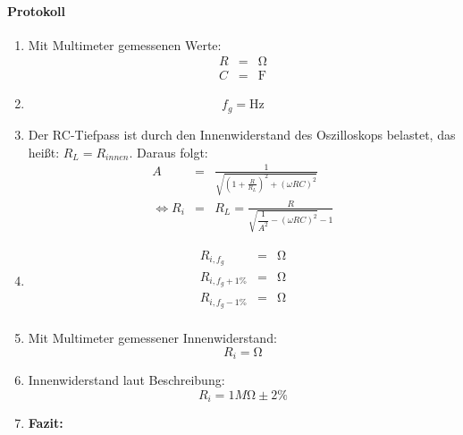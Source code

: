 \documentclass[10pt]{scrreprt}
\begin{document}
    \paragraph{Protokoll}
    \begin{enumerate}
        \item Mit Multimeter gemessenen Werte:
            \begin{eqnarray*}
                R &=& \si{\ohm}\\
                C &=& \si{\farad}
            \end{eqnarray*}
        \item
            \begin{equation*}
                f_g = \si{\hertz}
            \end{equation*}
        \item
            Der RC-Tiefpass ist durch den Innenwiderstand des Oszilloskops
            belastet, das heißt: $R_L = R_{innen}$. Daraus folgt:
            \begin{eqnarray*}
                A &=& \frac{1}{\sqrt{{\left(1+\frac{R}{R_L}\right)}^2 + {(\omega R C)}^2}}\\
                \Leftrightarrow
                R_i &=& R_L = \frac{R}{\sqrt{\dfrac{1}{A^2} -{(\omega R C)}^2} - 1}
            \end{eqnarray*}
        \item
            \begin{eqnarray*}
                R_{i,f_g} &=& \si{\ohm}\\
                R_{i,f_g+1\%} &=& \si{\ohm}\\
                R_{i,f_g-1\%} &=& \si{\ohm}\\
            \end{eqnarray*}
        \item
            Mit Multimeter gemessener Innenwiderstand:
            \begin{equation*}
                R_i = \si{\ohm}
            \end{equation*}
        \item
            Innenwiderstand laut Beschreibung:
            \begin{equation*}
                R_i = 1 \si{M\ohm} \pm 2\%
            \end{equation*}
        \item \textbf{Fazit:}
    \end{enumerate}
\end{document}
